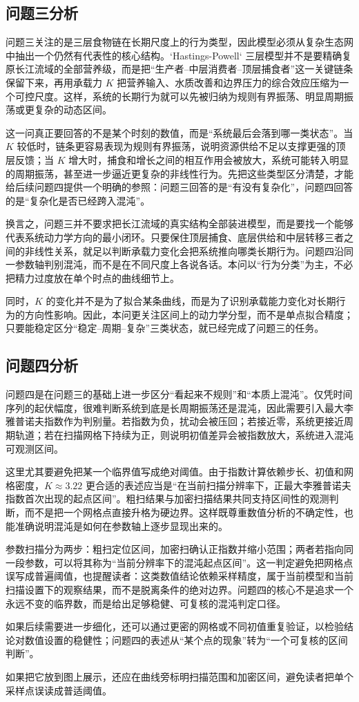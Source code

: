 \subsection{问题三分析}
问题三关注的是三层食物链在长期尺度上的行为类型，因此模型必须从复杂生态网中抽出一个仍然有代表性的核心结构。`Hastings-Powell` 三层模型并不是要精确复原长江流域的全部营养级，而是把“生产者--中层消费者--顶层捕食者”这一关键链条保留下来，再用承载力 \(K\) 把营养输入、水质改善和边界压力的综合效应压缩为一个可控尺度。这样，系统的长期行为就可以先被归纳为规则有界振荡、明显周期振荡或更复杂的动态区间。

这一问真正要回答的不是某个时刻的数值，而是“系统最后会落到哪一类状态”。当 \(K\) 较低时，链条更容易表现为规则有界振荡，说明资源供给不足以支撑更强的顶层反馈；当 \(K\) 增大时，捕食和增长之间的相互作用会被放大，系统可能转入明显的周期振荡，甚至进一步逼近更复杂的非线性行为。先把这些类型区分清楚，才能给后续问题四提供一个明确的参照：问题三回答的是“有没有复杂化”，问题四回答的是“复杂化是否已经跨入混沌”。

换言之，问题三并不要求把长江流域的真实结构全部装进模型，而是要找一个能够代表系统动力学方向的最小闭环。只要保住顶层捕食、底层供给和中层转移三者之间的非线性关系，就足以判断承载力变化会把系统推向哪类长期行为。问题四沿同一参数轴判别混沌，而不是在不同尺度上各说各话。本问以“行为分类”为主，不必把精力过度放在单个时点的曲线细节上。

同时，\(K\) 的变化并不是为了拟合某条曲线，而是为了识别承载能力变化对长期行为的方向性影响。因此，本问更关注区间上的动力学分型，而不是单点拟合精度；只要能稳定区分“稳定--周期--复杂”三类状态，就已经完成了问题三的任务。

\subsection{问题四分析}
问题四是在问题三的基础上进一步区分“看起来不规则”和“本质上混沌”。仅凭时间序列的起伏幅度，很难判断系统到底是长周期振荡还是混沌，因此需要引入最大李雅普诺夫指数作为判别量。若指数为负，扰动会被压回；若接近零，系统更接近周期轨道；若在扫描网格下持续为正，则说明初值差异会被指数放大，系统进入混沌可观测区间。

这里尤其要避免把某一个临界值写成绝对阈值。由于指数计算依赖步长、初值和网格密度，\(K\approx 3.22\) 更合适的表述应当是“在当前扫描分辨率下，正最大李雅普诺夫指数首次出现的起点区间”。粗扫结果与加密扫描结果共同支持区间性的观测判断，而不是把一个网格点直接升格为硬边界。这样既尊重数值分析的不确定性，也能准确说明混沌是如何在参数轴上逐步显现出来的。

参数扫描分为两步：粗扫定位区间，加密扫确认正指数并缩小范围；两者若指向同一段参数，可以将其称为“当前分辨率下的混沌起点区间”。这一判定避免把网格点误写成普遍阈值，也提醒读者：这类数值结论依赖采样精度，属于当前模型和当前扫描设置下的观察结果，而不是脱离条件的绝对边界。问题四的核心不是追求一个永远不变的临界数，而是给出足够稳健、可复核的混沌判定口径。

如果后续需要进一步细化，还可以通过更密的网格或不同初值重复验证，以检验结论对数值设置的稳健性；问题四的表述从“某个点的现象”转为“一个可复核的区间判断”。

如果把它放到图上展示，还应在曲线旁标明扫描范围和加密区间，避免读者把单个采样点误读成普适阈值。
